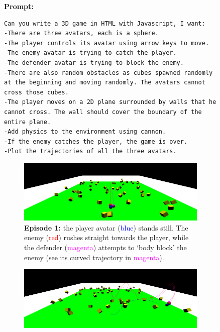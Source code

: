\begin{figure}[H]
\begin{AIbox}{\DV}
{\bf Prompt:}
\vspace{-0.3cm}
\begin{verbatim}
Can you write a 3D game in HTML with Javascript, I want:
-There are three avatars, each is a sphere.
-The player controls its avatar using arrow keys to move.
-The enemy avatar is trying to catch the player.
-The defender avatar is trying to block the enemy.
-There are also random obstacles as cubes spawned randomly at the beginning and moving randomly. The avatars cannot cross those cubes.
-The player moves on a 2D plane surrounded by walls that he cannot cross. The wall should cover the boundary of the entire plane. 
-Add physics to the environment using cannon.
-If the enemy catches the player, the game is over.
-Plot the trajectories of all the three avatars.
\end{verbatim}
\begin{subfigure}
\centering
\captionsetup{width=1\linewidth}
\includegraphics[width=1\linewidth]{figures/3d_game_run_1.png}
\caption*{\scriptsize {\bf Episode 1:} the player avatar (\textcolor{blue}{blue}) stands still. The enemy (\textcolor{red}{red}) rushes straight towards the player, while the defender (\textcolor{magenta}{magenta}) attempts to `body block' the enemy (see its curved trajectory in \textcolor{magenta}{magenta}).}
\end{subfigure}
\hfill
\begin{subfigure}
\centering
\captionsetup{width=1\linewidth}
\includegraphics[width=1\linewidth]{figures/3d_game_run_2.png}

\end{subfigure}
\end{AIbox}
\end{figure}

